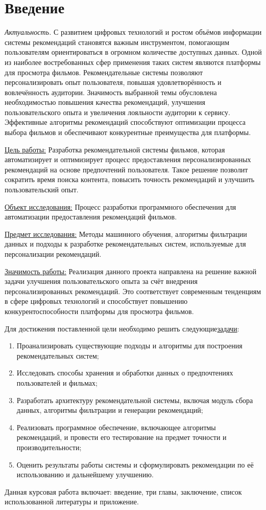 \chapter*{Введение}
\textit{Актуальность.}
С развитием цифровых технологий и ростом объёмов информации системы рекомендаций становятся важным инструментом,
помогающим пользователям ориентироваться в огромном количестве доступных данных.
Одной из наиболее востребованных сфер применения таких систем являются платформы для просмотра фильмов.
Рекомендательные системы позволяют персонализировать опыт пользователя, повышая удовлетворённость и вовлечённость аудитории.
Значимость выбранной темы обусловлена необходимостью повышения качества рекомендаций, улучшения пользовательского опыта
и увеличения лояльности аудитории к сервису.
Эффективные алгоритмы рекомендаций способствуют оптимизации процесса выбора фильмов и обеспечивают конкурентные преимущества для платформы.

\underline{Цель работы:}
Разработка рекомендательной системы фильмов, которая автоматизирует и оптимизирует процесс предоставления
персонализированных рекомендаций на основе предпочтений пользователя.
Такое решение позволит сократить время поиска контента, повысить точность рекомендаций и улучшить пользовательский опыт.

\underline{Объект исследования:}
Процесс разработки программного обеспечения для автоматизации предоставления рекомендаций фильмов.

\underline{Предмет исследования:}
Методы машинного обучения, алгоритмы фильтрации данных и подходы к разработке рекомендательных систем, используемые для персонализации рекомендаций.

\underline{Значимость работы:}
Реализация данного проекта направлена на решение важной задачи улучшения пользовательского опыта за счёт внедрения
персонализированных рекомендаций.
Это соответствует современным тенденциям в сфере цифровых технологий и способствует повышению конкурентоспособности платформы для просмотра фильмов.

Для достижения поставленной цели необходимо решить следующие\underline{задачи}:

\begin{enumerate}
    \item Проанализировать существующие подходы и алгоритмы для построения рекомендательных систем;
    \item Исследовать способы хранения и обработки данных о предпочтениях пользователей и фильмах;
    \item Разработать архитектуру рекомендательной системы, включая модуль сбора данных, алгоритмы фильтрации и генерации рекомендаций;
    \item Реализовать программное обеспечение, включающее алгоритмы рекомендаций, и провести его тестирование на предмет точности и производительности;
    \item Оценить результаты работы системы и сформулировать рекомендации по её использованию и дальнейшему улучшению.
\end{enumerate}
Данная курсовая работа включает: введение, три главы, заключение,
список использованной литературы и приложение.

